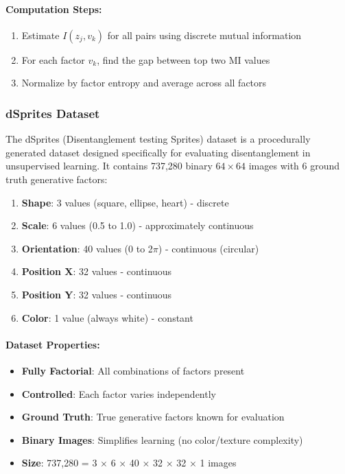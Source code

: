\documentclass[conference]{IEEEtran}
\begin{document}
\paragraph{Computation Steps:}
\begin{enumerate}
    \item Estimate $I(z_j, v_k)$ for all pairs using discrete mutual information
    \item For each factor $v_k$, find the gap between top two MI values
    \item Normalize by factor entropy and average across all factors
\end{enumerate}

\subsubsection{dSprites Dataset}

The dSprites (Disentanglement testing Sprites) dataset is a procedurally generated dataset designed specifically for evaluating disentanglement in unsupervised learning. It contains 737,280 binary $64 \times 64$ images with 6 ground truth generative factors:

\begin{enumerate}
    \item \textbf{Shape}: 3 values (square, ellipse, heart) - discrete
    \item \textbf{Scale}: 6 values (0.5 to 1.0) - approximately continuous
    \item \textbf{Orientation}: 40 values (0 to 2$\pi$) - continuous (circular)
    \item \textbf{Position X}: 32 values - continuous
    \item \textbf{Position Y}: 32 values - continuous
    \item \textbf{Color}: 1 value (always white) - constant
\end{enumerate}

\paragraph{Dataset Properties:}
\begin{itemize}
    \item \textbf{Fully Factorial}: All combinations of factors present
    \item \textbf{Controlled}: Each factor varies independently
    \item \textbf{Ground Truth}: True generative factors known for evaluation
    \item \textbf{Binary Images}: Simplifies learning (no color/texture complexity)
    \item \textbf{Size}: 737,280 = 3 × 6 × 40 × 32 × 32 × 1 images
\end{itemize}
\end{document}
